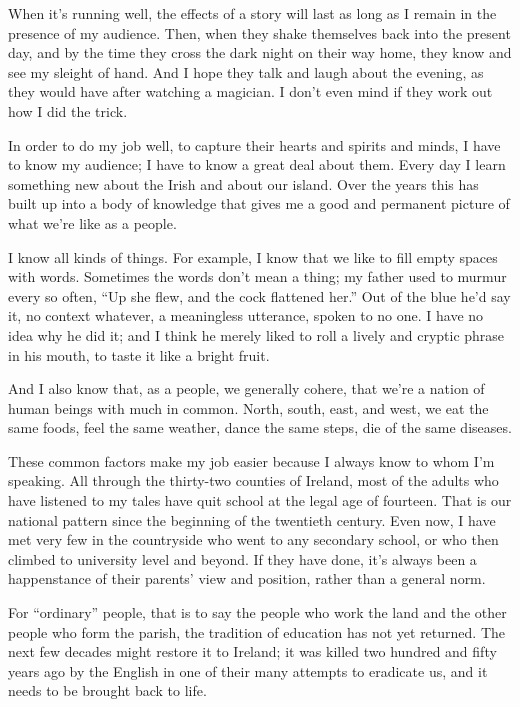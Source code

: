 \documentclass[openany]{memoir}
\begin{document}
When it's running well, the effects of a story will last as long as I remain in the presence of my audience.
Then, when they shake themselves back into the present day, and by the time they cross the dark night on their way home, they know and see my sleight of hand.
And I hope they talk and laugh about the evening, as they would have after watching a magician.
I don't even mind if they work out how I did the trick.

\vspace{1em}

\noindent In order to do my job well, to capture their hearts and spirits and minds, I have to know my audience; I have to know a great deal about them.
Every day I learn something new about the Irish and about our island.
Over the years this has built up into a body of knowledge that gives me a good and permanent picture of what we're like as a people.

I know all kinds of things.
For example, I know that we like to fill empty spaces with words.
Sometimes the words don't mean a thing; my father used to murmur every so often, ``Up she flew, and the cock flattened her.'' Out of the blue he'd say it, no context whatever, a meaningless utterance, spoken to no one.
I have no idea why he did it; and I think he merely liked to roll a lively and cryptic phrase in his mouth, to taste it like a bright fruit.

And I also know that, as a people, we generally cohere, that we're a nation of human beings with much in common.
North, south, east, and west, we eat the same foods, feel the same weather, dance the same steps, die of the same diseases.

These common factors make my job easier because I always know to whom I'm speaking.
All through the thirty-two counties of Ireland, most of the adults who have listened to my tales have quit school at the legal age of fourteen.
That is our national pattern since the beginning of the twentieth century.
Even now, I have met very few in the countryside who went to any secondary school, or who then climbed to university level and beyond.
If they have done, it's always been a happenstance of their parents' view and position, rather than a general norm.

For ``ordinary'' people, that is to say the people who work the land and the other people who form the parish, the tradition of education has not yet returned.
The next few decades might restore it to Ireland; it was killed two hundred and fifty years ago by the English in one of their many attempts to eradicate us, and it needs to be brought back to life.
\end{document}
